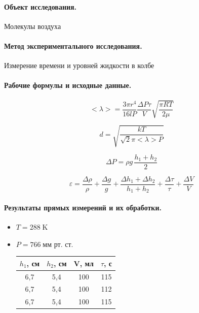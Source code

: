 \documentclass{article}
\begin{document}
\paragraph{Объект исследования.}
Молекулы воздуха

\paragraph{Метод экспериментального исследования.}
Измерение времени и уровней жидкости в колбе

 \paragraph{Рабочие формулы и исходные данные.}\hypertarget{formuls}{}
 \begin{equation}
 	<\lambda>=\frac{3\pi r^4}{16lP} \frac{\Delta P\tau}{V} \sqrt{\frac{\pi RT}{2\mu}}
 \end{equation}

\begin{equation}
	d=\sqrt{\frac{kT}{\sqrt{2}\pi <\lambda>P}}
\end{equation}

\begin{equation}
	\Delta P=\rho g\, \frac{h_1+h_2}{2}
\end{equation}

\begin{equation}
	\varepsilon=\frac{\Delta \rho}{\rho}+\frac{\Delta g}{g}+\frac{\Delta h_1+\Delta h_2}{h_1+h_2}+\frac{\Delta \tau}{\tau}+\frac{\Delta V}{V}
\end{equation}

\paragraph{Результаты прямых измерений и их обработки.}
\begin{itemize}
	\item $T=288\;\mbox{K}$
	\item$P=766\;\mbox{мм рт. ст.}$
	\begin{table}[htb]
	\begin{tabular}{c|c|c|c}
		$h_1$,  см & $h_2$,  см & V,  мл & $\tau$,  с \\
		\hline
		6,7 & 5,4 & 100 & 115 \\
	
		6,7 & 5,4 & 100 & 112 \\
	
		6,7 & 5,4 & 100 & 115 \\
	
	\end{tabular}
\end{table}
\end{itemize}
\end{document}
